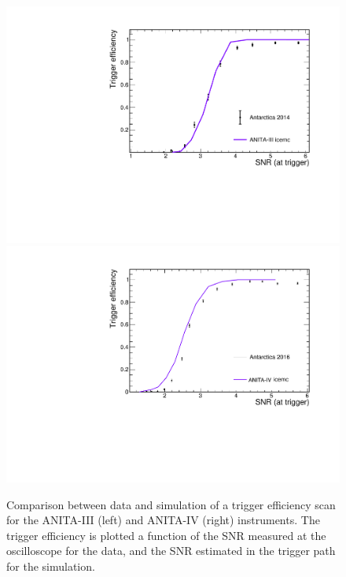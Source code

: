 \begin{figure}[!h]\centering
  \includegraphics[width=.45\linewidth]{./Figs/EfficiencyScanNoDelaysA3_efficiencyVSsnrTrigger.pdf}
    \includegraphics[width=.45\linewidth]{./Figs/EfficiencyScanNoDelaysA4_efficiencyVSsnrTrigger.pdf}
  \caption{Comparison between data and simulation of a trigger efficiency scan for the ANITA-III (left) and ANITA-IV (right) instruments. 
    The trigger efficiency is plotted a function of the SNR
    measured at the oscilloscope for the data, and the SNR estimated in the trigger path for the simulation. 
    }
  \label{fig:scans}
\end{figure}


